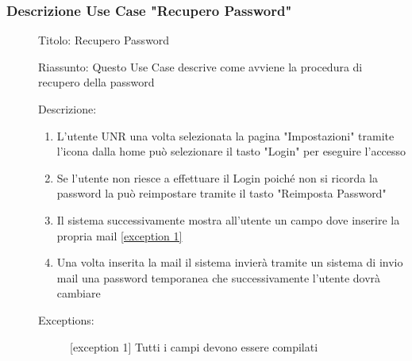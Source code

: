 \documentclass{article}
\begin{document}
\subsubsection*{Descrizione Use Case "Recupero Password"}
\begin{description}
    \item[] Titolo: Recupero Password
    \item[] Riassunto: Questo Use Case descrive come avviene la procedura di recupero della password
    \item[] Descrizione:
        \begin{enumerate}
            \item L'utente UNR una volta selezionata la pagina "Impostazioni" tramite l'icona  dalla home può selezionare il tasto "Login" per eseguire l'accesso
            \item Se l'utente non riesce a effettuare il Login poiché non si ricorda la password la può reimpostare tramite il tasto "Reimposta Password"
            \item Il sistema successivamente mostra all'utente un campo dove inserire la propria mail \hyperref[exc:9.1]{[exception 1]}
            \item Una volta inserita la mail il sistema invierà tramite un sistema di invio mail una password temporanea che successivamente l'utente dovrà cambiare
        \end{enumerate}
    \item[] Exceptions:
        \begin{description}
            \item[] \label{exc:9.1} [exception 1] Tutti i campi devono essere compilati
        \end{description}
\end{description}
\end{document}
